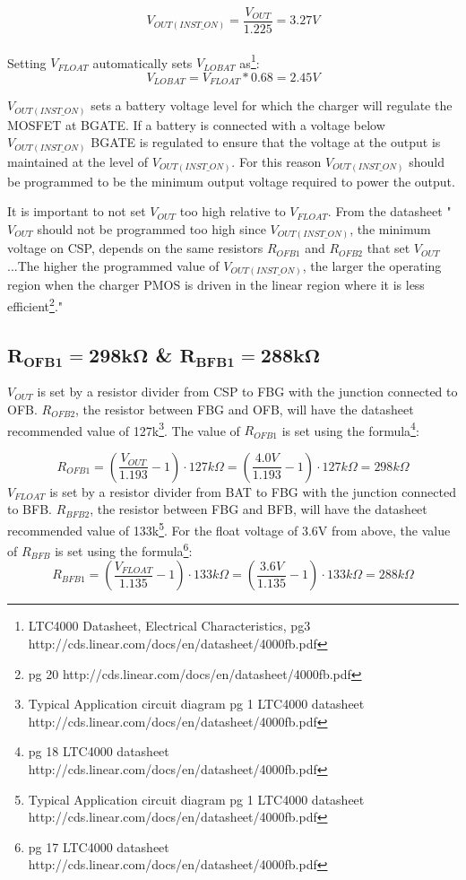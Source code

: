 \documentclass{article}
\begin{document}
\[V_{OUT(INST\_ON)} = \frac{V_{OUT}}{1.225} = 3.27V\]\\
Setting $V_{FLOAT}$ automatically sets $V_{LOBAT}$  as\footnote{LTC4000 Datasheet, Electrical Characteristics, pg3 http://cds.linear.com/docs/en/datasheet/4000fb.pdf}:
\[V_{LOBAT} = V_{FLOAT}*0.68 = 2.45V\]

$V_{OUT(INST\_ON)}$ sets a battery voltage level for which the charger will regulate the MOSFET at BGATE. If a battery is connected with a voltage below $V_{OUT(INST\_ON)}$ BGATE is regulated to ensure that the voltage at the output is maintained at the level of $V_{OUT(INST\_ON)}$. For this reason $V_{OUT(INST\_ON)}$ should be programmed to be the minimum output voltage required to power the output.

It is important to not set $V_{OUT}$ too high relative to $V_{FLOAT}$. From the datasheet "$V_{OUT}$ should not be programmed too high since $V_{OUT(INST\_ON)}$, the minimum 
voltage on CSP, depends on the same resistors $R_{OFB1}$ and 
$R_{OFB2}$ that set $V_{OUT}$...The higher the programmed value of 
$V_{OUT(INST\_ON)}$, the larger the operating region when the 
charger PMOS is driven in the linear region where it is 
less efficient\footnote{pg 20 http://cds.linear.com/docs/en/datasheet/4000fb.pdf}." 


\subsection{$\mathbf{R_{OFB1} = 298k\Omega}$ \& $\mathbf{R_{BFB1}=288k\Omega}$}
$V_{OUT}$ is set by a resistor divider from CSP to FBG with the junction connected to OFB. $R_{OFB2}$, the resistor between FBG and OFB, will have the datasheet recommended value of 127k\footnote{Typical Application circuit diagram pg 1 LTC4000 datasheet http://cds.linear.com/docs/en/datasheet/4000fb.pdf}. The value of $R_{OFB1}$ is set using the formula\footnote{pg 18 LTC4000 datasheet http://cds.linear.com/docs/en/datasheet/4000fb.pdf}:

\[R_{OFB1} = \left ( \frac{V_{OUT}}{1.193} - 1 \right)  \cdot 127k\Omega=\left ( \frac{4.0V}{1.193} - 1 \right)\cdot 127k\Omega = 298k\Omega\]
$V_{FLOAT}$ is set by a resistor divider from BAT to FBG with the junction connected to BFB. $R_{BFB2}$, the resistor between FBG and BFB, will have the datasheet recommended value of 133k\footnote{Typical Application circuit diagram pg 1 LTC4000 datasheet http://cds.linear.com/docs/en/datasheet/4000fb.pdf}. For the float voltage of 3.6V from above, the value of $R_{BFB}$ is set using the formula\footnote{pg 17 LTC4000 datasheet http://cds.linear.com/docs/en/datasheet/4000fb.pdf}: 
\[R_{BFB1} = \left ( \frac{V_{FLOAT}}{1.135} - 1 \right ) \cdot 133k\Omega = \left ( \frac{3.6V}{1.135} - 1 \right ) \cdot 133k\Omega  = 288k\Omega\]
\end{document}
